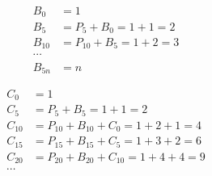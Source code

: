\documentclass[10pt]{book}
\begin{document}
\begin{mdSnippets}
\newcommand{\Z}{\mathbb{Z}}

\begin{mdDisplaySnippet}%
  \begin{align*}
    B_0 &= 1 \\
    B_5 &= P_5 + B_0 = 1 + 1 = 2\\ 
    B_{10} &= P_{10} + B_5 = 1 + 2 = 3\\
    \cdots&\\
    B_{5 n} & = n
  \end{align*}\end{mdDisplaySnippet}%
\begin{mdDisplaySnippet}%
  \begin{align*}
    C_0 &= 1 \\
    C_5 &= P_5 + B_5 = 1 + 1 = 2\\ 
    C_{10} &= P_{10} + B_{10} + C_0 = 1 + 2 + 1 = 4\\
    C_{15} &= P_{15} + B_{15} + C_5 = 1 + 3 + 2 = 6\\
    C_{20} &= P_{20} + B_{20} + C_{10} = 1 + 4 + 4 = 9\\
    \cdots&\\
  \end{align*}\end{mdDisplaySnippet}%

\end{mdSnippets}
\end{document}

